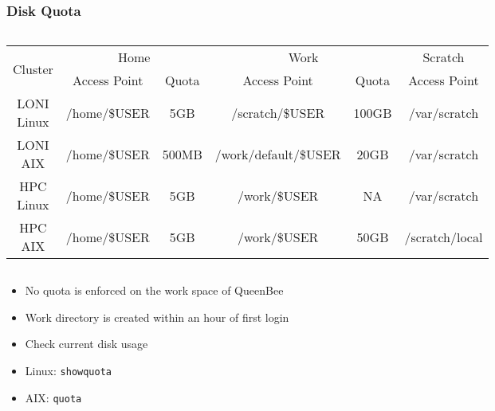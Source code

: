 \documentclass[slidestop,mathserif,compress,xcolor=svgnames,table]{beamer}
\begin{document}
\begin{frame}
\frametitle{\small Disk Quota}
{\scriptsize
\begin{columns}
\column{12cm}
\begin{block}{}
\begin{center}
\begin{tabular}{|c|c|c|c|c|c|}
\hline
\multirow{2}{*}{Cluster} & \multicolumn{2}{c|}{Home} & \multicolumn{2}{c|}{Work} & Scratch \\
\cline{2-6}
 & Access Point & Quota & Access Point & Quota & Access Point \\
\hline
LONI Linux & /home/\$USER & 5GB & /scratch/\$USER & 100GB & /var/scratch\\
\hline
LONI AIX & /home/\$USER & 500MB & /work/default/\$USER & 20GB & /var/scratch\\
\hline
HPC Linux & /home/\$USER & 5GB & /work/\$USER & NA & /var/scratch\\
\hline
HPC AIX & /home/\$USER & 5GB & /work/\$USER & 50GB & /scratch/local\\
\hline
\end{tabular}
\end{center}
\end{block}
\end{columns}
}
{\footnotesize
\begin{itemize}
\item No quota is enforced on the work space of QueenBee
\item Work directory is created within an hour of first login
\item Check current disk usage
\item[] Linux: \texttt{showquota}
\item[] AIX: \texttt{quota}
\end{itemize}
}
\end{frame}
\end{document}
